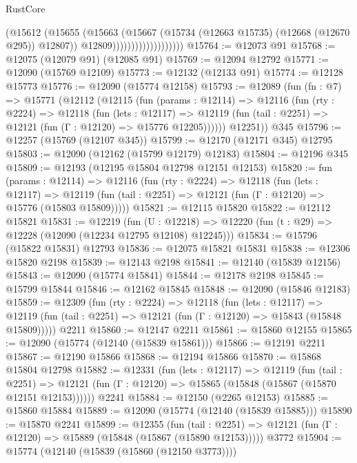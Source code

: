 \begin{lexlean}{RustCore}
\begin{coremodule}
                                    (@15612
                                      (@15655
                                        (@15663
                                          (@15667
                                            (@15734 (@12663 @15735) (@12668 (@12670 @295)) @12807))
                                          @12809)))))))))))))))))))
@15764 := @12073 @91
@15768 := @12075 (@12079 @91) (@12085 @91)
@15769 := @12094 @12792
@15771 := @12090 (@15769 @12109)
@15773 := @12132 (@12133 @91)
@15774 := @12128 @15773
@15776 := @12090 (@15774 @12158)
@15793 := @12089
    (fun (fn : @7) =>
    @15771
      (@12112
        (@12115
          (fun (params : @12114) =>
          @12116
            (fun (rty : @2224) =>
            @12118
              (fun (lets : @12117) =>
              @12119 (fun (tail : @2251) => @12121 (fun (Γ : @12120) => @15776 @12205))))))
        @12251))
    @345
@15796 := @12257 (@15769 (@12107 @345))
@15799 := @12170 (@12171 @345) @12795
@15803 := @12090 (@12162 (@15799 @12179) @12183)
@15804 := @12196 @345
@15809 := @12193 (@12195 @15804 @12798 @12151 @12153)
@15820 := fun (params : @12114) =>
  @12116
    (fun (rty : @2224) =>
    @12118
      (fun (lets : @12117) =>
      @12119 (fun (tail : @2251) => @12121 (fun (Γ : @12120) => @15776 (@15803 @15809)))))
@15821 := @12115 @15820
@15822 := @12112 @15821
@15831 := @12219
    (fun (U : @12218) => @12220 (fun (t : @29) => @12228 (@12090 (@12234 @12795 @12108) @12245)))
@15834 := @15796 (@15822 @15831) @12793
@15836 := @12075 @15821 @15831
@15838 := @12306 @15820 @2198
@15839 := @12143 @2198
@15841 := @12140 (@15839 @12156)
@15843 := @12090 (@15774 @15841)
@15844 := @12178 @2198
@15845 := @15799 @15844
@15846 := @12162 @15845
@15848 := @12090 (@15846 @12183)
@15859 := @12309
    (fun (rty : @2224) =>
    @12118
      (fun (lets : @12117) =>
      @12119 (fun (tail : @2251) => @12121 (fun (Γ : @12120) => @15843 (@15848 @15809)))))
    @2211
@15860 := @12147 @2211
@15861 := @15860 @12155
@15865 := @12090 (@15774 (@12140 (@15839 @15861)))
@15866 := @12191 @2211
@15867 := @12190 @15866
@15868 := @12194 @15866
@15870 := @15868 @15804 @12798
@15882 := @12331
    (fun (lets : @12117) =>
    @12119
      (fun (tail : @2251) =>
      @12121 (fun (Γ : @12120) => @15865 (@15848 (@15867 (@15870 @12151 @12153))))))
    @2241
@15884 := @12150 (@2265 @12153)
@15885 := @15860 @15884
@15889 := @12090 (@15774 (@12140 (@15839 @15885)))
@15890 := @15870 @2241
@15899 := @12355
    (fun (tail : @2251) => @12121 (fun (Γ : @12120) => @15889 (@15848 (@15867 (@15890 @12153)))))
    @3772
@15904 := @15774 (@12140 (@15839 (@15860 (@12150 @3773))))

\end{coremodule}
\end{lexlean}
